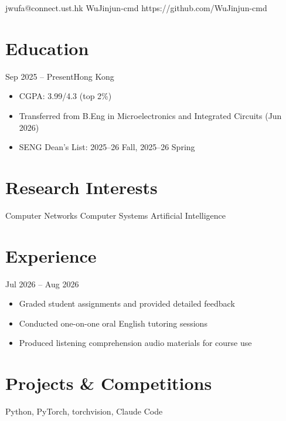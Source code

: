 \documentclass{common/resume}
\begin{document}
  {jwufa@connect.ust.hk}
  {WuJinjun-cmd}
  {https://github.com/WuJinjun-cmd}

\section{Education}

  {Sep 2025 -- Present}{Hong Kong}

\begin{itemize}
  \item CGPA: 3.99/4.3 (top 2\%)
  \item Transferred from B.Eng in Microelectronics and Integrated Circuits (Jun 2026)
  \item SENG Dean's List: 2025--26 Fall, 2025--26 Spring
\end{itemize}

\section{Research Interests}

Computer Networks \textbullet{} Computer Systems \textbullet{} Artificial Intelligence

\section{Experience}

  {Jul 2026 -- Aug 2026}{}

\begin{itemize}
  \item Graded student assignments and provided detailed feedback
  \item Conducted one-on-one oral English tutoring sessions
  \item Produced listening comprehension audio materials for course use
\end{itemize}

\section{Projects \& Competitions}

  {Python, PyTorch, torchvision, Claude Code}
\end{document}
